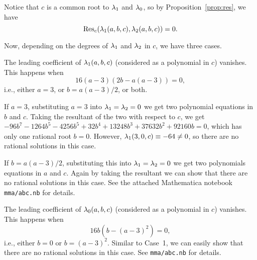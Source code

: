 Notice that $c$ is a common root to $\lambda_1$ and $\lambda_0$, so by
Proposition~\ref{prop:res}, we have
\[
\mathrm{Res}_c(\lambda_1(a, b, c), \lambda_2(a, b, c)) = 0.
\]

Now, depending on the degrees of $\lambda_1$ and $\lambda_2$ in $c$, we have
three cases.

\begin{case}
  The leading coefficient of $\lambda_1(a, b, c)$ (considered as a
  polynomial in $c$) vanishes. This happens when
  \[
  16(a - 3)(2b - a(a-3)) = 0,
  \]
  i.e., either $a = 3$, or $b = a(a-3)/2$, or both.

  If $a = 3$, substituting $a = 3$ into $\lambda_1 = \lambda_2 = 0$ we get two
  polynomial equations in $b$ and $c$. Taking the resultant of the two
  with respect to $c$, we get $- 96b^7 - 1264b^5 - 4256b^5 + 32b^4 +
  13248b^3 + 37632b^2 + 92160b = 0$, which has only one rational root
  $b = 0$. However, $\lambda_1(3, 0, c) \equiv -64 \ne 0$, so there are no
  rational solutions in this case.

  If $b = a(a-3)/2$, substituting this into $\lambda_1 = \lambda_2 = 0$ we get
  two polynomials equations in $a$ and $c$. Again by taking the
  resultant we can show that there are no rational solutions in this
  case. See the attached Mathematica notebook \texttt{mma/abc.nb} for
  details.
\end{case}

\begin{case}
  The leading coefficient of $\lambda_0(a, b, c)$ (considered as a
  polynomial in $c$) vanishes. This happens when
  \[
  16b(b - (a-3)^2) = 0,
  \]
  i.e., either $b = 0$ or $b = (a - 3)^2$. Similar to Case~1, we can
  easily show that there are no rational solutions in this case. See
  \texttt{mma/abc.nb} for details.
\end{case}

